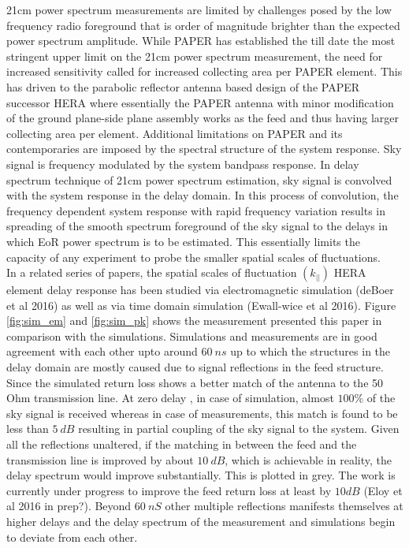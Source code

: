 \documentclass[twocolumn]{emulateapj}
\begin{document}
21cm power spectrum measurements are limited by challenges posed by the low frequency radio foreground that is order of magnitude brighter than the expected power spectrum amplitude. While PAPER has established the till date the most stringent upper limit on the 21cm power spectrum measurement, the need for increased sensitivity called for increased collecting area per PAPER element. This has driven to the parabolic reflector antenna based design of the PAPER successor HERA where essentially the PAPER antenna with minor modification of the ground plane-side plane assembly works as the feed and thus having larger collecting area per element. Additional limitations on PAPER and its contemporaries are imposed by the spectral structure of the system response. Sky signal is frequency modulated by the system bandpass response. In delay spectrum technique of 21cm power spectrum estimation, sky signal is convolved with the system response in the delay domain. In this process of convolution, the frequency dependent system response with rapid frequency variation results in spreading of the smooth spectrum foreground of the sky signal to the delays in which EoR power spectrum is to be estimated. This essentially limits the capacity of any experiment to probe the smaller spatial scales of fluctuations. \\
	In a related series of papers, the spatial scales of fluctuation $(k_||)$ HERA element delay response has been studied via electromagnetic simulation (deBoer et al 2016) as well as via time domain simulation (Ewall-wice et al 2016). Figure \ref{fig:sim_em} and \ref{fig:sim_pk} shows the measurement presented this paper in comparison with the simulations. Simulations and measurements are in good agreement with each other upto around $60~ns$ up to which the structures in the delay domain are mostly caused due to signal reflections in the feed structure. Since the simulated return loss shows a better match of the antenna to the 50 Ohm transmission line. At zero delay , in case of simulation, almost $100\%$ of the sky signal is received whereas in case of measurements, this match is found to be less than $5~dB$ resulting in partial coupling of the sky signal to the system. Given all the reflections unaltered, if the matching in between the feed and the transmission line is improved by about $10~dB$, which is achievable in reality, the delay spectrum would improve substantially. This is plotted in grey. The work is currently under progress to improve the feed return loss at least by  $10dB$ (Eloy et al 2016 in prep?). Beyond $60~nS$ other multiple reflections manifests themselves at higher delays and the delay spectrum of the measurement and simulations begin to deviate from each other.\\
\end{document}
